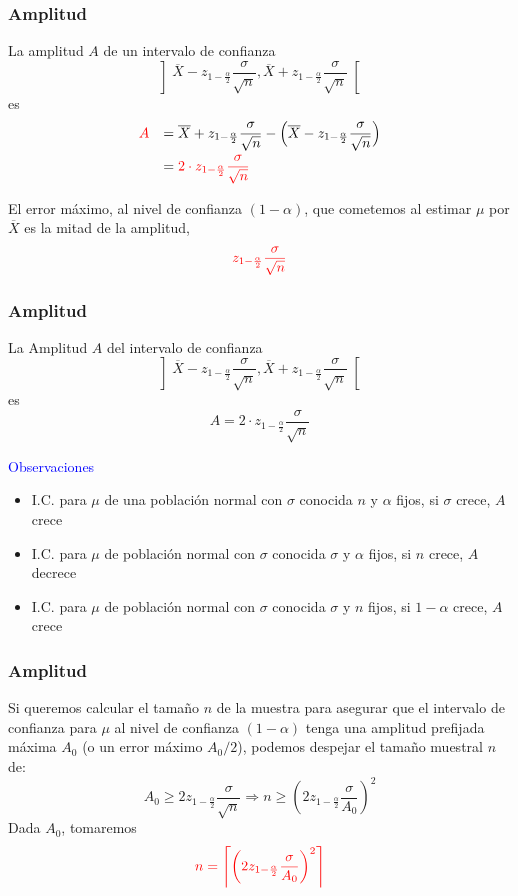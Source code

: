\documentclass[12pt,t]{beamer}
\newcommand{\red}[1]{\textcolor{red}{#1}}
\newcommand{\blue}[1]{\textcolor{blue}{#1}}
\renewcommand{\emph}[1]{{\color{red}#1}}
\renewcommand{\geq}{\geqslant}
\theoremstyle{plain}
\theoremstyle{definition}
\begin{document}
\begin{frame}
\frametitle{Amplitud}

La \emph{amplitud} $A$ de un intervalo de confianza  
$$
\left]\overline{X} -z_{1-\frac{\alpha}{2}} \frac{\sigma}{\sqrt{n}}, \overline{X}+z_{1-\frac{\alpha}{2}}\frac{\sigma}{\sqrt{n}}
\right[
$$
es
$$
\begin{array}{rl}
\red{A}& \displaystyle =\overline{X}+ z_{1-\frac{\alpha}{2}}\frac{\sigma}{\sqrt{n}}-\Big(\overline{X} -z_{1-\frac{\alpha}{2}}\frac{\sigma}{\sqrt{n}}\Big)\\[2ex] & \displaystyle =\red{2\cdot z_{1-\frac{\alpha}{2}}\frac{\sigma}{\sqrt{n}}}
\end{array}
$$

El \emph{error máximo}, al nivel de confianza  $(1-\alpha)$, que cometemos al estimar $\mu$
por  $\overline{X}$ es la mitad de la amplitud, 
$$
\red{z_{1-\frac{\alpha}{2}}\frac{\sigma}{\sqrt{n}}}
$$
\end{frame}

\begin{frame}
\frametitle{Amplitud}

La \emph{Amplitud} $A$ del intervalo de confianza 
$$
\left]\overline{X} -z_{1-\frac{\alpha}{2}} \frac{\sigma}{\sqrt{n}}, \overline{X}+z_{1-\frac{\alpha}{2}}\frac{\sigma}{\sqrt{n}}
\right[
$$
es
$$
A= 2\cdot z_{1-\frac{\alpha}{2}}\frac{\sigma}{\sqrt{n}}
$$

\blue{Observaciones}
\begin{itemize}
\item I.C. para $\mu$ de una población normal con $\sigma$ conocida $n$ y $\alpha$ fijos, si $\sigma$ crece,
 $A$ crece
\smallskip

\item I.C. para $\mu$ de población normal con $\sigma$ conocida $\sigma$ y $\alpha$ fijos, si $n$
crece,  $A$ decrece
\smallskip

\item I.C. para $\mu$ de población normal con $\sigma$ conocida $\sigma$ y $n$ fijos, si
$1-\alpha$ crece, $A$ crece
\end{itemize}
\end{frame}




\begin{frame}
\frametitle{Amplitud}

Si queremos calcular el   tamaño  $n$ de la muestra para asegurar que el intervalo de confianza  para $\mu$ al nivel de confianza $(1-\alpha)$ tenga una amplitud prefijada máxima $A_0$ (o un
error máximo $A_0/2$), podemos despejar el tamaño muestral  $n$ de:
$$
A_0\geq 2z_{1-\frac{\alpha}{2}}\frac{\sigma}{\sqrt{n}}\Rightarrow
n\geq \left( 2 z_{1-\frac{\alpha}{2}}\frac{\sigma}{A_0}
\right)^2
$$
Dada $A_0$, tomaremos
$$
\red{n=\left\lceil \left( 2 z_{1-\frac{\alpha}{2}}\frac{\sigma}{A_0}
\right)^2\right\rceil}
$$

\end{frame}
\end{document}
